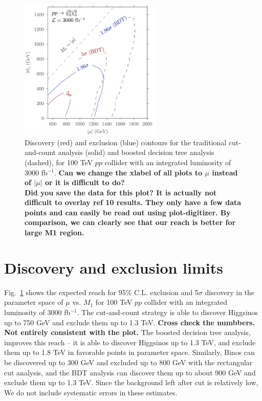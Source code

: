 \documentclass[a4paper,11pt]{article}
\newcommand{\Shufang}[1]{{\bf\color{Maroon}  #1}}
\begin{document}
\begin{figure}[h]
\centering
\includegraphics[width=0.6\textwidth]{images/dm_100_TeV_contours.png}

\caption{ Discovery (red) and exclusion (blue) contours for the traditional
  cut-and-count analysis (solid) and boosted decision tree analysis (dashed),
  for 100 TeV $pp$ collider with an integrated luminosity of 3000 fb$^{-1}$.
\Shufang{Can we change the xlabel of all plots to $\mu$ instead of $|\mu|$ or it is difficult to do?}\\  \Shufang{Did you save the data for this plot?  It is actually not difficult to overlay ref 10 results.  They only have a few data points and can easily be read out using plot-digitizer.  By comparison, we can clearly see that our reach is better for large M1 region.}
}

\label{fig:contours}
\end{figure}

\section{Discovery and exclusion limits}
\label{sec:results}

Fig.~\ref{fig:contours} shows the expected reach  for 95\%
C.L. exclusion and 5$\sigma$ discovery in the parameter space of $\mu$ vs.
$M_1$ for 100 TeV $pp$ collider with an integrated luminosity of 3000
fb$^{-1}$. The cut-and-count strategy is able to discover Higgsinos up to 750
GeV  and exclude them up to 1.3 TeV. \Shufang{Cross check the numbbers. Not entirely consistent with the plot.}    The boosted decision tree analysis, improves this reach -- it
is able to discover Higgsinos up to 1.3 TeV, and exclude them up to 1.8 TeV in
favorable points in parameter space.  Similarly, Binos can be discovered up to
300 GeV and excluded up to 800 GeV with the rectangular cut analysis, and the
BDT analysis can discover them up to about 900 GeV and exclude them up to 1.3
TeV. Since the background left after cut is relatively low, We do not include
systematic errors in these estimates.  
\end{document}
